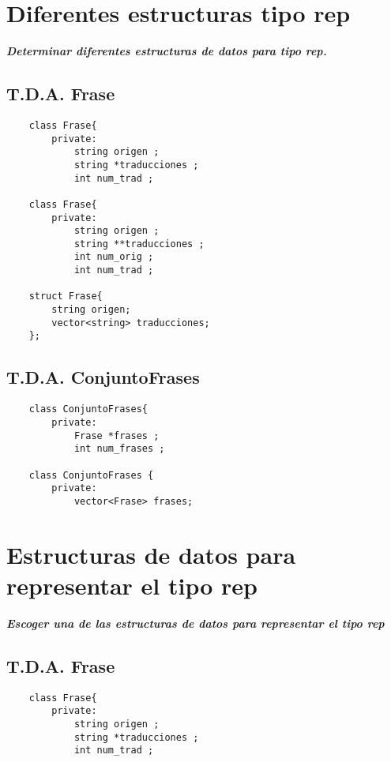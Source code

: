 \section{Diferentes estructuras tipo rep}
\textbf{\textit{Determinar diferentes estructuras de datos para tipo rep.}}

\subsection{T.D.A. Frase}
\begin{lstlisting}
	class Frase{
		private:
			string origen ;         
			string *traducciones ;  
			int num_trad ;  
				
	class Frase{
		private:        
			string origen ;         
			string **traducciones ; 
			int num_orig ; 
			int num_trad ;
			
	struct Frase{
		string origen;
		vector<string> traducciones;
	};
\end{lstlisting}

\subsection{T.D.A. ConjuntoFrases}
\begin{lstlisting}
	class ConjuntoFrases{
		private:
			Frase *frases ;     
			int num_frases ;
	
	class ConjuntoFrases {
		private:
			vector<Frase> frases; 	
\end{lstlisting}

\newpage


\section{Estructuras de datos para representar el tipo rep}
\textbf{\textit{Escoger una de las estructuras de datos para representar el tipo rep}}

\subsection{T.D.A. Frase}
\begin{lstlisting}
	class Frase{
		private:
			string origen ;         
			string *traducciones ;  
			int num_trad ;  
\end{lstlisting}

